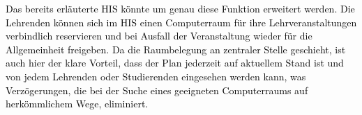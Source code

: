 \documentclass[a4paper]{article}
\begin{document}
\bigskip

{\sffamily
\textcolor{black}{Das bereits erläuterte HIS könnte um genau diese Funktion erweitert werden. Die Lehrenden können sich
im HIS einen Computerraum für ihre Lehrveranstaltungen verbindlich reservieren und bei Ausfall der Veranstaltung wieder
für die Allgemeinheit freigeben. Da die Raumbelegung an zentraler Stelle geschieht, ist auch hier der klare Vorteil,
dass der Plan jederzeit auf aktuellem Stand ist und von jedem Lehrenden oder Studierenden eingesehen werden kann, was
Verzögerungen, die bei der Suche eines geeigneten Computerraums auf herkömmlichem Wege, eliminiert. }}
\end{document}
